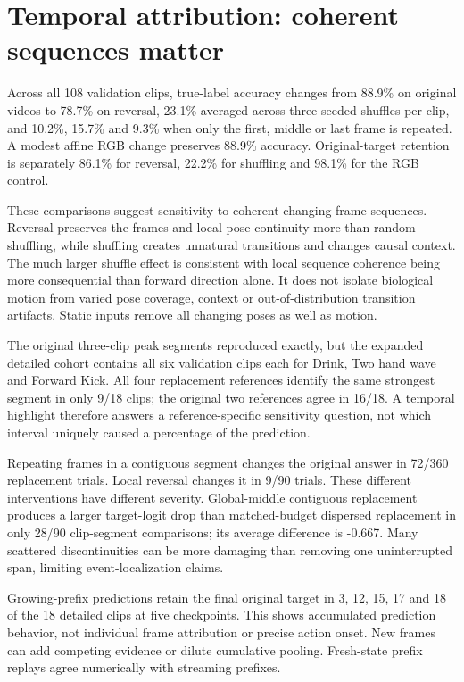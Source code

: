 \documentclass[11pt]{article}
\begin{document}
\section{Temporal attribution: coherent sequences matter}
Across all 108 validation clips, true-label accuracy changes from 88.9\% on original videos to 78.7\% on reversal, 23.1\% averaged across three seeded shuffles per clip, and 10.2\%, 15.7\% and 9.3\% when only the first, middle or last frame is repeated. A modest affine RGB change preserves 88.9\% accuracy. Original-target retention is separately 86.1\% for reversal, 22.2\% for shuffling and 98.1\% for the RGB control.

These comparisons suggest sensitivity to coherent changing frame sequences. Reversal preserves the frames and local pose continuity more than random shuffling, while shuffling creates unnatural transitions and changes causal context. The much larger shuffle effect is consistent with local sequence coherence being more consequential than forward direction alone. It does not isolate biological motion from varied pose coverage, context or out-of-distribution transition artifacts. Static inputs remove all changing poses as well as motion.

The original three-clip peak segments reproduced exactly, but the expanded detailed cohort contains all six validation clips each for Drink, Two hand wave and Forward Kick. All four replacement references identify the same strongest segment in only 9/18 clips; the original two references agree in 16/18. A temporal highlight therefore answers a reference-specific sensitivity question, not which interval uniquely caused a percentage of the prediction.

Repeating frames in a contiguous segment changes the original answer in 72/360 replacement trials. Local reversal changes it in 9/90 trials. These different interventions have different severity. Global-middle contiguous replacement produces a larger target-logit drop than matched-budget dispersed replacement in only 28/90 clip-segment comparisons; its average difference is -0.667. Many scattered discontinuities can be more damaging than removing one uninterrupted span, limiting event-localization claims.

Growing-prefix predictions retain the final original target in 3, 12, 15, 17 and 18 of the 18 detailed clips at five checkpoints. This shows accumulated prediction behavior, not individual frame attribution or precise action onset. New frames can add competing evidence or dilute cumulative pooling. Fresh-state prefix replays agree numerically with streaming prefixes.
\end{document}
